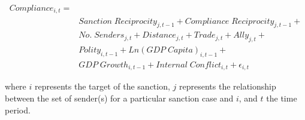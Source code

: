 \begin{align*}
		Compliance_{i,t} =& \\
		&Sanction \; Reciprocity_{j,t-1} + Compliance \; Reciprocity_{j,t-1} + \\
		&No. \; Senders_{j,t} + Distance_{j,t} + Trade_{j,t} + Ally_{j,t} + \\
		&Polity_{i,t-1} + Ln(GDP \; Capita)_{i,t-1} +\\
		&GDP \; Growth_{i,t-1} + Internal \; Conflict_{i,t} + \epsilon_{i,t}
\end{align*}

where $i$ represents the target of the sanction, $j$ represents the relationship between the set of sender(s) for a particular sanction case and $i$, and $t$ the time period.





